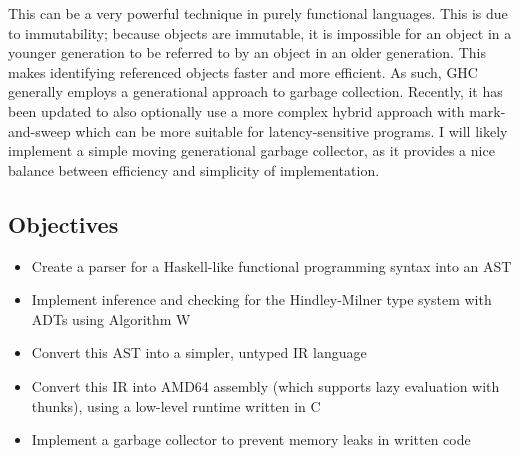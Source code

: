 \documentclass[9pt]{extarticle}
\begin{document}
This can be a very powerful technique in purely functional languages.
This is due to immutability; because objects are immutable, it is
impossible for an object in a younger generation to be referred to by an
object in an older generation. This makes identifying referenced objects
faster and more efficient. As such, GHC generally employs a generational
approach to garbage collection. Recently, it has been updated to also
optionally use a more complex hybrid approach with mark-and-sweep which
can be more suitable for latency-sensitive programs. I will likely
implement a simple moving generational garbage collector, as it provides
a nice balance between efficiency and simplicity of implementation.

\subsection{Objectives}

\begin{itemize}

  \item Create a parser for a Haskell-like functional programming syntax into an AST

  \item Implement inference and checking for the Hindley-Milner type system with ADTs
  using Algorithm W

  \item Convert this AST into a simpler, untyped IR language

  \item Convert this IR into AMD64 assembly (which supports lazy evaluation with
    thunks), using a low-level runtime written in C

  \item Implement a garbage collector to prevent memory leaks in written code

\end{itemize}
\end{document}
